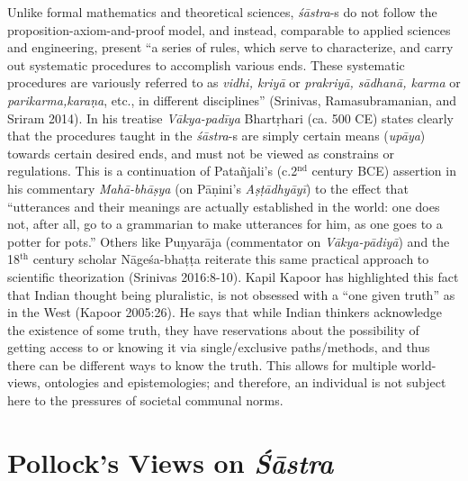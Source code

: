 Unlike formal mathematics and theoretical sciences, {\sl śāstra}-s do not follow the proposition-axiom-and-proof model, and instead, comparable to applied sciences and engineering, present ``a series of rules, which serve to characterize, and carry out systematic procedures to accomplish various ends. These systematic procedures are variously referred to as {\sl vidhi, kriyā} or {\sl prakriyā, sādhanā, karma} or {\sl parikarma,\break karaṇa}, etc., in different disciplines'' (Srinivas, Ramasubramanian, and Sriram 2014). In his treatise {\sl Vākya-padīya} Bhartṛhari (ca. 500 CE) states clearly that the procedures taught in the {\sl śāstra}-s are simply certain means ({\sl upāya}) towards certain desired ends, and must not be viewed as constrains or regulations. This is a continuation of Patañjali's (c.2$^{\text{nd}}$ century BCE) assertion in his commentary {\sl Mahā-bhāṣya} (on Pāṇini’s {\sl Aṣṭādhyāyī}) to the effect that ``utterances and their meanings are actually established in the world: one does not, after all, go to a grammarian to make utterances for him, as one goes to a potter for pots.'' Others like Puṇyarāja (commentator on {\sl Vākya-pādiyā}) and the 18$^{\text{th}}$ century scholar Nāgeśa-bhaṭṭa reiterate this same practical approach to scientific theorization (Srinivas 2016:8-10). Kapil Kapoor has highlighted this fact that Indian thought being pluralistic, is not obsessed with a ``one given truth'' as in the West (Kapoor 2005:26). He says that while Indian thinkers acknowledge the existence of some truth, they have reservations about the possibility of getting access to or knowing it via single/exclusive paths/methods, and thus there can be different ways to know the truth. This allows for multiple world-views, ontologies and epistemologies; and therefore, an individual is not subject here to the pressures of societal communal norms.  

\section*{Pollock’s Views on {\sl\bfseries Śāstra}}

